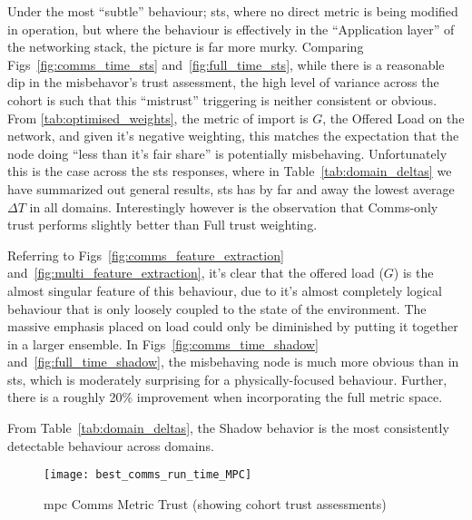 Under the most ``subtle'' behaviour; \gls{sts}, where no direct metric is being modified in operation, but where the behaviour is effectively in the ``Application layer'' of the networking stack, the picture is far more murky. 
Comparing Figs~\ref{fig:comms_time_sts} and~\ref{fig:full_time_sts}, while there is a reasonable dip in the misbehavor's trust assessment, the high level of variance across the cohort is such that this ``mistrust'' triggering is neither consistent or obvious. 
From \autoref{tab:optimised_weights}, the metric of import is $G$, the Offered Load on the network, and given it's negative weighting, this matches the expectation that the node doing ``less than it's fair share'' is potentially misbehaving. 
Unfortunately this is the case across the \gls{sts} responses, where in Table~\ref{tab:domain_deltas} we have summarized out general results, \gls{sts} has by far and away the lowest average $\Delta T$ in all domains. 
Interestingly however is the observation that Comms-only trust performs slightly better than Full trust weighting.

Referring to Figs~\ref{fig:comms_feature_extraction} and~\autoref{fig:multi_feature_extraction}, it's clear that the offered load ($G$) is the almost singular feature of this behaviour, due to it's almost completely logical behaviour that is only loosely coupled to the state of the environment. 
The massive emphasis placed on load could only be diminished by putting it together in a larger ensemble.
In Figs~\ref{fig:comms_time_shadow} and~\ref{fig:full_time_shadow}, the misbehaving node is much more obvious than in \gls{sts}, which is moderately surprising for a physically-focused behaviour. Further, there is a roughly 20\% improvement when incorporating the full metric space.

From Table~\ref{tab:domain_deltas}, the Shadow behavior is the most consistently detectable behaviour across domains. 




\begin{figure}[h]
  \centering
  \texttt{[image: best\_comms\_run\_time\_MPC]}
  \caption{\gls{mpc} Comms Metric Trust (showing cohort trust assessments)}
  \label{fig:comms_time_mpc}
\end{figure}

